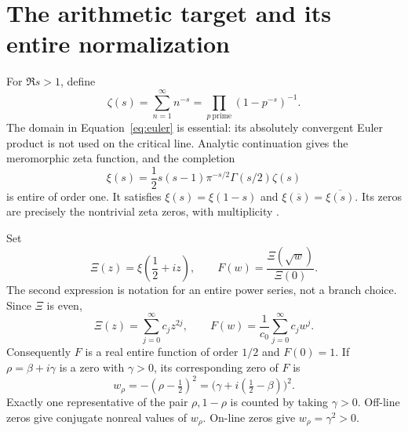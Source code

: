 \documentclass[11pt,letterpaper]{article}
\numberwithin{equation}{section}
\theoremstyle{definition}
\theoremstyle{remark}
\begin{document}
\section{The arithmetic target and its entire normalization}
\label{sec:normalization}
For $\Re s>1$, define
\begin{equation}
 \zeta(s)=\sum_{n=1}^{\infty}n^{-s}
 =\prod_{p\ \mathrm{prime}}(1-p^{-s})^{-1}.
 \label{eq:euler}
\end{equation}
The domain in Equation~\eqref{eq:euler} is essential: its absolutely convergent Euler product is not used on the critical line. Analytic continuation gives the meromorphic zeta function, and the completion
\begin{equation}
 \xi(s)=\frac12s(s-1)\pi^{-s/2}\Gamma(s/2)\zeta(s)
 \label{eq:xi}
\end{equation}
is entire of order one. It satisfies $\xi(s)=\xi(1-s)$ and $\xi(\overline s)=\overline{\xi(s)}$. Its zeros are precisely the nontrivial zeta zeros, with multiplicity \cite{riemann,titchmarsh,dlmf}.

Set
\begin{equation}
 \Xi(z)=\xi\!\left(\frac12+iz\right),\qquad
 F(w)=\frac{\Xi(\sqrt w)}{\Xi(0)}.
 \label{eq:normal}
\end{equation}
The second expression is notation for an entire power series, not a branch choice. Since $\Xi$ is even,
\begin{equation}
 \Xi(z)=\sum_{j=0}^{\infty}c_jz^{2j},\qquad
 F(w)=\frac1{c_0}\sum_{j=0}^{\infty}c_jw^j.
\end{equation}
Consequently $F$ is a real entire function of order $1/2$ and $F(0)=1$. If $\rho=\beta+i\gamma$ is a zero with $\gamma>0$, its corresponding zero of $F$ is
\begin{equation}
 w_\rho=-(\rho-\tfrac12)^2
       =\bigl(\gamma+i(\tfrac12-\beta)\bigr)^2.
 \label{eq:zerochange}
\end{equation}
Exactly one representative of the pair $\rho,1-\rho$ is counted by taking $\gamma>0$. Off-line zeros give conjugate nonreal values of $w_\rho$. On-line zeros give $w_\rho=\gamma^2>0$.
\end{document}

